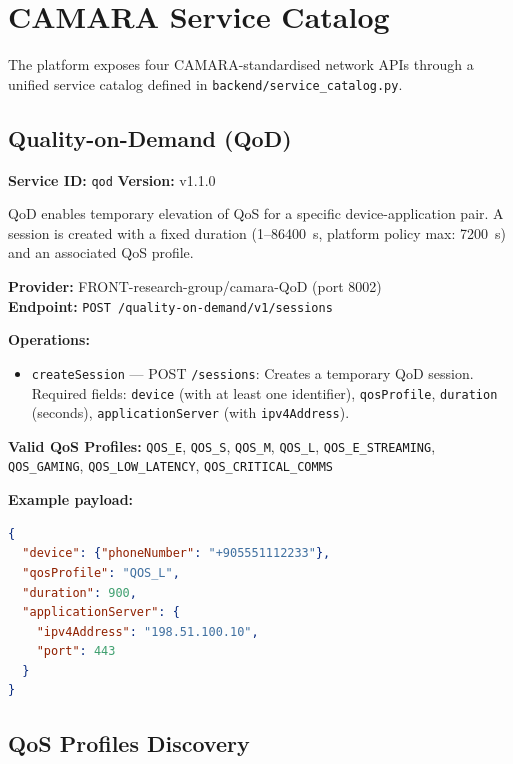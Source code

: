 \documentclass[conference]{IEEEtran}
\begin{document}
\section{CAMARA Service Catalog}
\label{sec:catalog}

The platform exposes four CAMARA-standardised network APIs through a unified
service catalog defined in \texttt{backend/service\_catalog.py}.

\subsection{Quality-on-Demand (QoD)}
\label{subsec:qod}

\textbf{Service ID:} \texttt{qod} \quad \textbf{Version:} v1.1.0

QoD enables temporary elevation of QoS for a specific device-application
pair. A session is created with a fixed duration (1–86400~s, platform policy
max: 7200~s) and an associated QoS profile.

\textbf{Provider:} FRONT-research-group/camara-QoD (port 8002) \\
\textbf{Endpoint:} \texttt{POST /quality-on-demand/v1/sessions}

\textbf{Operations:}
\begin{itemize}[leftmargin=1.2em]
  \item \texttt{createSession} — POST \texttt{/sessions}: Creates a temporary
        QoD session. Required fields: \texttt{device} (with at least one
        identifier), \texttt{qosProfile}, \texttt{duration} (seconds),
        \texttt{applicationServer} (with \texttt{ipv4Address}).
\end{itemize}

\textbf{Valid QoS Profiles:} \texttt{QOS\_E}, \texttt{QOS\_S},
\texttt{QOS\_M}, \texttt{QOS\_L}, \texttt{QOS\_E\_STREAMING},
\texttt{QOS\_GAMING}, \texttt{QOS\_LOW\_LATENCY}, \texttt{QOS\_CRITICAL\_COMMS}

\textbf{Example payload:}
\begin{lstlisting}[language=json]
{
  "device": {"phoneNumber": "+905551112233"},
  "qosProfile": "QOS_L",
  "duration": 900,
  "applicationServer": {
    "ipv4Address": "198.51.100.10",
    "port": 443
  }
}
\end{lstlisting}

\subsection{QoS Profiles Discovery}
\end{document}
